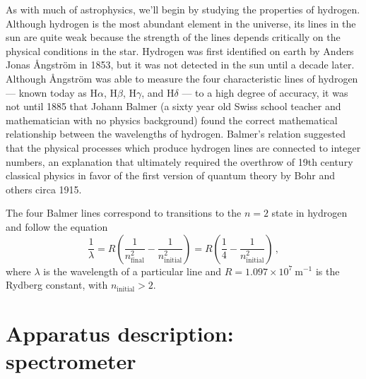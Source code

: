 As with much of astrophysics, we'll begin by studying the properties of hydrogen.
Although hydrogen is the most abundant element in the universe, its lines in the sun are
quite weak because the strength of the lines depends critically on the physical conditions
in the star. Hydrogen was first identified on earth by Anders Jonas Ångström in 1853, but
it was not detected in the sun until a decade later. Although Ångström was able to
measure the four characteristic lines of hydrogen --- known today as H$\alpha$, H$\beta$, H$\gamma$, and H$\delta$ --- to a high degree of accuracy, it was not until 1885 that Johann Balmer (a sixty year old
Swiss school teacher and mathematician with no physics background) found the correct
mathematical relationship between the wavelengths of hydrogen. Balmer's relation suggested that the physical processes which produce hydrogen lines are connected to
integer numbers, an explanation that ultimately required the overthrow of 19th century
classical physics in favor of the first version of quantum theory by Bohr and others circa
1915.

The four Balmer lines correspond to transitions to the $n=2$ state in hydrogen %
and follow the equation
\begin{equation}\label{spec:eqn:balmer}
 \frac{1}{\lambda} = R \left( \frac{1}{n^2_\textrm{final}} - \frac{1}{n^2_\textrm{initial}} \right)
 = R \left( \frac{1}{4} - \frac{1}{n^2_\textrm{initial}} \right) \,,
\end{equation}
where $\lambda$ is the wavelength of a particular line and $R = 1.097 \times 10^7\:\mathrm{m}^{-1}$ is the Rydberg constant, with $n_\textrm{initial}>2$.

\section{Apparatus description: spectrometer}

